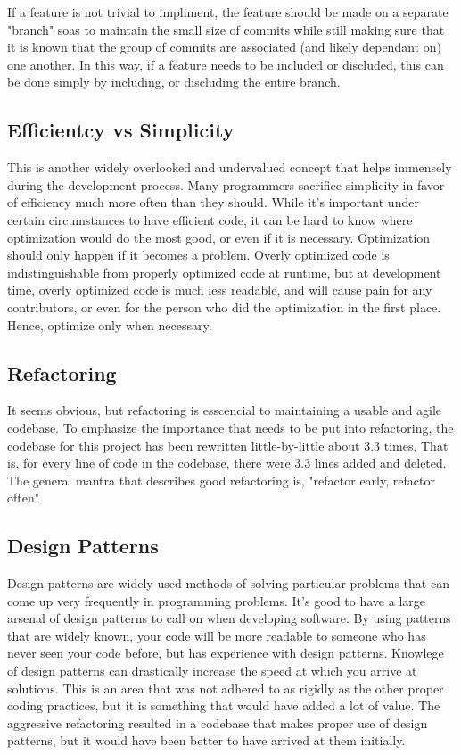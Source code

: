 \documentclass[se]{uw-wkrpt}
\begin{document}
If a feature is not trivial to impliment, the feature should be
made on a separate "branch" soas to maintain the small size of commits
while still making sure that it is known that the group of commits are 
associated (and likely dependant on) one another. In this way, if a feature
needs to be included or discluded, this can be done simply by including, or 
discluding the entire branch.

\subsection{Efficientcy vs Simplicity}

This is another widely overlooked and undervalued concept that 
helps immensely during the development process. Many programmers
sacrifice simplicity in favor of efficiency much more often than
they should. While it's important under certain circumstances to
have efficient code, it can be hard to know where optimization would
do the most good, or even if it is necessary. Optimization should
only happen if it becomes a problem. Overly optimized code is indistinguishable
from properly optimized code at runtime, but at development time, 
overly optimized code is much less readable, and will cause pain
for any contributors, or even for the person who did the optimization
in the first place. Hence, optimize only when necessary.

\subsection{Refactoring}

It seems obvious, but refactoring is esscencial to maintaining a usable and agile
codebase. To emphasize the importance that needs to be put into refactoring, the 
codebase for this project has been rewritten little-by-little about 3.3 times.
That is, for every line of code in the codebase, there were 3.3 lines added and deleted.
The general mantra that describes good refactoring is, "refactor early, refactor often".

\subsection{Design Patterns}

Design patterns are widely used methods of solving particular problems that can
come up very frequently in programming problems. It's good to have a large arsenal
of design patterns to call on when developing software. By using patterns that
are widely known, your code will be more readable to someone who has never seen
your code before, but has experience with design patterns. Knowlege of design
patterns can drastically increase the speed at which you arrive at solutions.
This is an area that was not adhered to as rigidly as the other proper coding practices,
but it is something that would have added a lot of value. The aggressive refactoring
resulted in a codebase that makes proper use of design patterns, but it would
have been better to have arrived at them initially.
\end{document}
